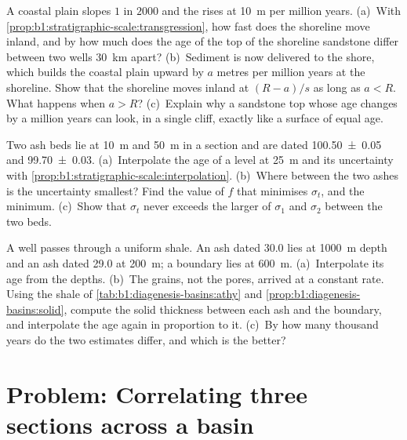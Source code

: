 \begin{exercise}[$\star\star\star$]\label{exo:b1:stratigraphic-scale:10}
A coastal plain slopes $1$ in $2000$ and the  rises at
\qty{10}{m} per million years. (a)~With
\cref{prop:b1:stratigraphic-scale:transgression}, how fast does the shoreline
move inland, and by how much does the age of the top of the shoreline sandstone
differ between two wells \qty{30}{km} apart? (b)~Sediment is now delivered to the
shore, which builds the coastal plain upward by $a$ metres per million years at
the shoreline. Show that the shoreline moves inland at $(R - a)/s$ as long as
$a < R$. What happens when $a > R$? (c)~Explain why a sandstone top whose age
changes by a million years can look, in a single cliff, exactly like a surface of
equal age.
\end{exercise}

\begin{exercise}[$\star\star\star$]\label{exo:b1:stratigraphic-scale:11}
Two ash beds lie at \qty{10}{m} and \qty{50}{m} in a section and are dated
\qty[uncertainty-mode=separate]{100.50(5)}{\Ma} and \qty[uncertainty-mode=separate]{99.70(3)}{\Ma}. (a)~Interpolate the age of a level
at \qty{25}{m} and its uncertainty with
\cref{prop:b1:stratigraphic-scale:interpolation}. (b)~Where between the two ashes
is the uncertainty smallest? Find the value of $f$ that minimises $\sigma_t$, and
the minimum. (c)~Show that $\sigma_t$ never exceeds the larger of $\sigma_1$ and
$\sigma_2$ between the two beds.
\end{exercise}

\begin{exercise}[$\star\star\star$]\label{exo:b1:stratigraphic-scale:12}
A well passes through a uniform shale. An ash dated \qty{30.0}{\Ma} lies at
\qty{1000}{m} depth and an ash dated \qty{29.0}{\Ma} at \qty{200}{m}; a 
boundary lies at \qty{600}{m}. (a)~Interpolate its age from the depths. (b)~The
grains, not the pores, arrived at a constant rate. Using the shale of
\cref{tab:b1:diagenesis-basins:athy} and
\cref{prop:b1:diagenesis-basins:solid}, compute the solid thickness between each
ash and the boundary, and interpolate the age again in proportion to it.
(c)~By how many thousand years do the two estimates differ, and which is the
better?
\end{exercise}

\section{Problem: Correlating three sections across a basin}

